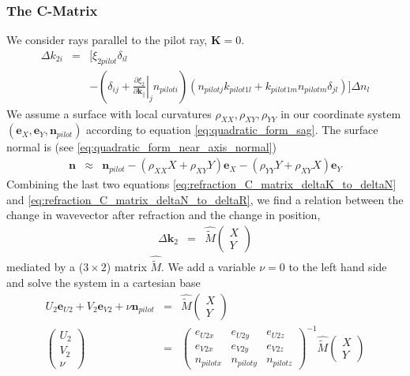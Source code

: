 \documentclass[12pt,a4paper,twoside,openright,BCOR10mm,headsepline,titlepage,abstracton,chapterprefix,final]{scrreprt}
\newcommand\Vector[1]{{\mathbf{#1}}}
\newcommand\wavenumber{k}
\newcommand\Wavevector{\Vector{\wavenumber}}
\begin{document}
\subsubsection{The C-Matrix}
We consider rays parallel to the pilot ray, $\Vector{K} = 0$.
\begin{eqnarray}
 \Delta \wavenumber_{2i} &=& 
 \Bigg[
     \xi_{2 pilot} \delta_{il} \nonumber\\
 &&- 
     \left( 
       \delta_{ij}
       + \left. \frac{\partial \xi_2}{\partial \Wavevector_{\parallel}} \right|_j n_{pilot i}
     \right) 
     ( n_{pilot j} \wavenumber_{pilot1 l} + \wavenumber_{pilot1 m}   n_{pilot m} \delta_{jl}) 
   \Bigg] \Delta n_l
   \label{eq:refraction_C_matrix_deltaK_to_deltaN}
\end{eqnarray}
We assume a surface with local curvatures $\rho_{XX}, \rho_{XY}, \rho_{YY}$ in our coordinate system
$(\Vector{e}_X, \Vector{e}_Y, \Vector{n}_{pilot})$ according to equation \eqref{eq:quadratic_form_sag}.
The surface normal is (see \eqref{eq:quadratic_form_near_axis_normal})
\begin{eqnarray}
 \Vector{n} &\approx& 
 \Vector{n}_{pilot}
 - (\rho_{XX} X + \rho_{XY} Y) \Vector{e}_X
 - (\rho_{YY} Y + \rho_{XY} X) \Vector{e}_Y
 \label{eq:refraction_C_matrix_deltaN_to_deltaR}
\end{eqnarray}
Combining the last two equations \eqref{eq:refraction_C_matrix_deltaK_to_deltaN} and \eqref{eq:refraction_C_matrix_deltaN_to_deltaR},
we find a relation between the change in wavevector after refraction and the change in position,
\begin{eqnarray}
 \Delta \Wavevector_2 &=& 
 \hat{\tilde{M}}
 \begin{pmatrix}
  X \\ Y
 \end{pmatrix}
\end{eqnarray}
mediated by a ($3\times2$) matrix $\hat{\tilde{M}}$.
We add a variable $\nu=0$ to the left hand side and solve the system in a cartesian base
\begin{eqnarray}
   U_2 \Vector{e}_{U2}
 + V_2 \Vector{e}_{V2}
 + \nu \Vector{n}_{pilot}
 &=& 
 \hat{\tilde{M}}
 \begin{pmatrix}
  X \\ Y
 \end{pmatrix}
 \\
 \begin{pmatrix}
  U_2 \\ V_2 \\ \nu
 \end{pmatrix}
 &=&
 \begin{pmatrix}
  e_{U2x} & e_{U2y} & e_{U2z} \\
  e_{V2x} & e_{V2y} & e_{V2z} \\
  n_{pilot x} & n_{pilot y} & n_{pilot z}
 \end{pmatrix}^{-1}
 \hat{\tilde{M}}
 \begin{pmatrix}
  X \\ Y
 \end{pmatrix}
\end{eqnarray}
\end{document}
